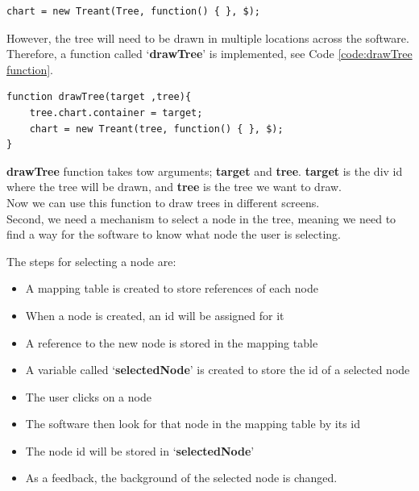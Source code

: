 \documentclass[11pt]{article} %
\begin{document}
\noindent
\begin{minipage}[c]{\linewidth}
\begin{lstlisting}[basicstyle=\scriptsize, tabsize=4, frame=single, caption=Basic Tree Drawing, label=code:basicTreeDraw]
chart = new Treant(Tree, function() { }, $);
\end{lstlisting}
\end{minipage}
\noindent
However, the tree will need to be drawn in multiple locations across the software. Therefore, a function called `\textbf{drawTree}' is implemented, see Code \ref{code:drawTree function}.

\noindent
\begin{minipage}[c]{\linewidth}
\begin{lstlisting}[basicstyle=\scriptsize, tabsize=4, frame=single, caption=drawTree Function, label=code:drawTree function]
function drawTree(target ,tree){
	tree.chart.container = target;
	chart = new Treant(tree, function() { }, $);
}
\end{lstlisting}
\end{minipage}

\noindent
\textbf{drawTree} function takes tow arguments; \textbf{target} and \textbf{tree}. \textbf{target} is the div id where the tree will be drawn, and \textbf{tree} is the tree we want to draw.\\
Now we can use this function to draw trees in different screens.\\[12pt]

\noindent
Second, we need a mechanism to select a node in the tree, meaning we need to find a way for the software to know what node the user is selecting.

\noindent
The steps for selecting a node are:
\begin{itemize}
\item A mapping table is created to store references of each node
\item When a node is created, an id will be assigned for it
\item A reference to the new node is stored in the mapping table
\item A variable called `\textbf{selectedNode}' is created to store the id of a selected node
\item The user clicks on a node
\item The software then look for that node in the mapping table by its id
\item The node id will be stored in `\textbf{selectedNode}'
\item As a feedback, the background of the selected node is changed.
\end{itemize}
\end{document}
